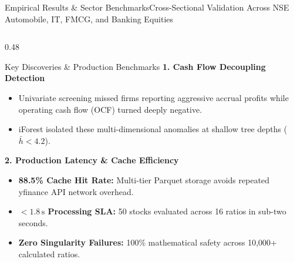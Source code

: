 \begin{frame}{Empirical Results \& Sector Benchmarks}{Cross-Sectional Validation Across NSE Automobile, IT, FMCG, and Banking Equities}
\begin{columns}[T]
        \begin{column}{0.48\textwidth}
            \begin{quantcard}[height=5.55cm]{Key Discoveries \& Production Benchmarks}
                \fontsize{6.3pt}{8.1pt}\selectfont
                \textbf{\color{deepemerald}1. Cash Flow Decoupling Detection}
                \begin{itemize}
                    \setlength{\itemsep}{1.5pt}
                    \item Univariate screening missed firms reporting aggressive accrual profits while operating cash flow (OCF) turned deeply negative.
                    \item iForest isolated these multi-dimensional anomalies at shallow tree depths ($\bar{h} < 4.2$).
                \end{itemize}

                \vspace{4pt}
                \textbf{\color{deepemerald}2. Production Latency \& Cache Efficiency}
                \begin{itemize}
                    \setlength{\itemsep}{1.5pt}
                    \item \textbf{88.5\% Cache Hit Rate:} Multi-tier Parquet storage avoids repeated yfinance API network overhead.
                    \item \textbf{$< 1.8\,\text{s}$ Processing SLA:} 50 stocks evaluated across 16 ratios in sub-two seconds.
                    \item \textbf{Zero Singularity Failures:} 100\% mathematical safety across 10,000+ calculated ratios.
                \end{itemize}
                \vfill
            \end{quantcard}
        \end{column}
    \end{columns}

    \vspace{0.1cm}
    \hfill {}
\end{frame}
